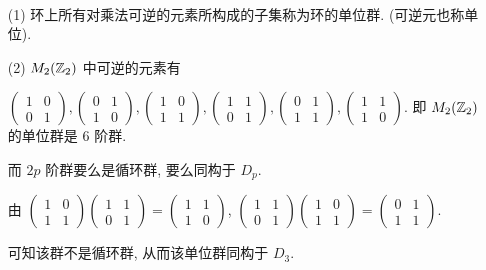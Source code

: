 \begin{solution}\
	\begin{itemize}
		\item[(1)] 环上所有对乘法可逆的元素所构成的子集称为环的单位群. (可逆元也称单位).
		
		\item[(2)] $M_2(\mathbb Z_2)$ 中可逆的元素有
		
		$\left(\begin{array}{cc}1 & 0\\0 & 1\end{array}\right),
		\left(\begin{array}{cc}0 & 1\\1 & 0\end{array}\right),
		\left(\begin{array}{cc}1 & 0\\1 & 1\end{array}\right),
		\left(\begin{array}{cc}1 & 1\\0 & 1\end{array}\right),
		\left(\begin{array}{cc}0 & 1\\1 & 1\end{array}\right),
		\left(\begin{array}{cc}1 & 1\\1 & 0\end{array}\right).
		$
		即 $M_2(\mathbb Z_2)$ 的单位群是 $6$ 阶群.
		
		而 $2p$ 阶群要么是循环群, 要么同构于 $D_p$.
		
		由 
		$\left(\begin{array}{cc}1 & 0\\1 & 1\end{array}\right)\left(\begin{array}{cc}1 & 1\\0 & 1\end{array}\right)=
		\left(\begin{array}{cc}1 & 1\\1 & 0\end{array}\right)$,
		$\left(\begin{array}{cc}1 & 1\\0 & 1\end{array}\right)\left(\begin{array}{cc}1 & 0\\1 & 1\end{array}\right)=
		\left(\begin{array}{cc}0 & 1\\1 & 1\end{array}\right)$. 
		
		可知该群不是循环群, 从而该单位群同构于 $D_3$.
	\end{itemize}
\end{solution}

